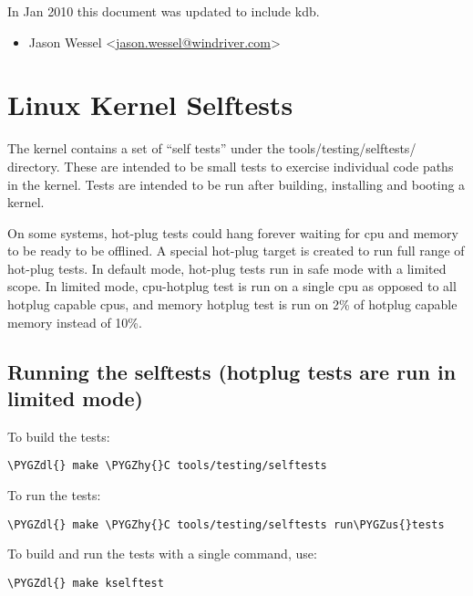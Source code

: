 \documentclass[a4paper,8pt,english]{sphinxmanual}
\def\PYGZus{\char`\_}
\def\PYGZdl{\char`\$}
\def\PYGZhy{\char`\-}
\begin{document}
In Jan 2010 this document was updated to include kdb.
\begin{itemize}
\item {} 
Jason Wessel \textless{}\href{mailto:jason.wessel@windriver.com}{jason.wessel@windriver.com}\textgreater{}

\end{itemize}


\chapter{Linux Kernel Selftests}
\label{dev-tools/kselftest:linux-kernel-selftests}\label{dev-tools/kselftest::doc}
The kernel contains a set of ``self tests'' under the tools/testing/selftests/
directory. These are intended to be small tests to exercise individual code
paths in the kernel. Tests are intended to be run after building, installing
and booting a kernel.

On some systems, hot-plug tests could hang forever waiting for cpu and
memory to be ready to be offlined. A special hot-plug target is created
to run full range of hot-plug tests. In default mode, hot-plug tests run
in safe mode with a limited scope. In limited mode, cpu-hotplug test is
run on a single cpu as opposed to all hotplug capable cpus, and memory
hotplug test is run on 2\% of hotplug capable memory instead of 10\%.


\section{Running the selftests (hotplug tests are run in limited mode)}
\label{dev-tools/kselftest:running-the-selftests-hotplug-tests-are-run-in-limited-mode}
To build the tests:

\begin{Verbatim}[commandchars=\\\{\}]
\PYGZdl{} make \PYGZhy{}C tools/testing/selftests
\end{Verbatim}

To run the tests:

\begin{Verbatim}[commandchars=\\\{\}]
\PYGZdl{} make \PYGZhy{}C tools/testing/selftests run\PYGZus{}tests
\end{Verbatim}

To build and run the tests with a single command, use:

\begin{Verbatim}[commandchars=\\\{\}]
\PYGZdl{} make kselftest
\end{Verbatim}
\end{document}
